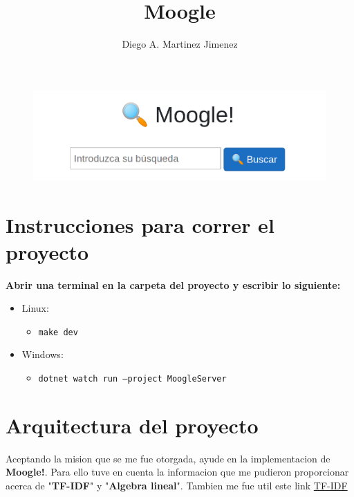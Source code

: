 \documentclass[10pt,a4paper]{report}
\author{Diego A. Martinez Jimenez}
\title{Moogle}
\begin{document}
\maketitle

\begin{figure}
    \begin{center}
        \includegraphics[width = 0.8\linewidth]{moogle.png}
    \end{center}
\end{figure}

\renewcommand{\thesection}{\arabic{section}}

\section{Instrucciones para correr el proyecto}

\textbf{Abrir una terminal en la carpeta del proyecto y escribir lo siguiente:}

\begin{itemize}
    \item Linux:
          \begin{itemize} \item \texttt{make dev} \end{itemize}
    \item Windows:
          \begin{itemize} \item \texttt{dotnet watch run --project MoogleServer}\end{itemize}
\end{itemize}

\section{Arquitectura del proyecto}

\begin{flushleft}

    Aceptando la mision que se me fue otorgada, ayude en la implementacion de \textbf{Moogle!}. Para ello tuve en cuenta la informacion que me pudieron proporcionar acerca de "\textbf{TF-IDF}" y "\textbf{Algebra lineal}". Tambien me fue util este link  \href{https://en.wikipedia.org/wiki/Tf%E2%80%93idf}{TF-IDF}

\end{flushleft}
    
\end{document}
